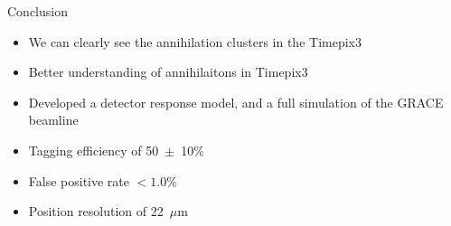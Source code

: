 \documentclass{beamer}
\begin{document}
\begin{frame}{Conclusion}
  \begin{itemize}
  \item{We can clearly see the annihilation clusters in the Timepix3}
  \item{Better understanding of annihilaitons in Timepix3}
  \item{Developed a detector response model, and a full simulation of the GRACE beamline}
  \item{Tagging efficiency of 50~$\pm$~10\%}
  \item{False positive rate $< 1.0$\%}
  \item{Position resolution of 22~$\mu$m}
  \end{itemize}
\end{frame}
  
\end{document}
